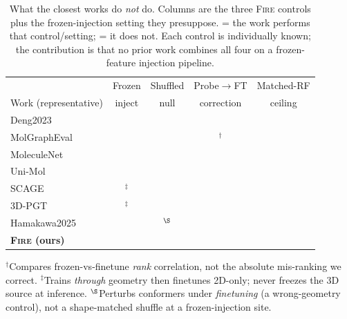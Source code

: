 \documentclass[sigconf,nonacm,anonymous,review]{acmart}
\newcommand{\cmark}{\textcolor{green!55!black}{\checkmark}}
\newcommand{\xmark}{\textcolor{red!70!black}{\ding{55}}}
\begin{document}
\begin{table}[t]
\centering
\caption{What the closest works do \emph{not} do. Columns are the three
\textsc{Fire} controls plus the frozen-injection setting they presuppose.
\cmark{} = the work performs that control/setting; \xmark{} = it does not.
Each control is individually known; the contribution is that no prior work
combines all four on a frozen-feature injection pipeline.}
\label{tab:positioning}
\small
\setlength{\tabcolsep}{4pt}
\begin{tabular}{@{}lcccc@{}}
\toprule
 & Frozen & Shuffled & Probe$\to$FT & Matched-RF \\
Work (representative) & inject & null & correction & ceiling \\
\midrule
Deng2023~\cite{deng2023systematic}        & \xmark & \xmark & \xmark & \cmark \\
MolGraphEval~\cite{wang2023molgrapheval}  & \xmark & \xmark & \xmark$^{\dagger}$ & \xmark \\
MoleculeNet~\cite{wu2018moleculenet}      & \xmark & \xmark & \xmark & \xmark \\
Uni-Mol~\cite{zhou2023unimol}             & \xmark & \xmark & \xmark & \xmark \\
SCAGE~\cite{qiao2025scage}                & \xmark$^{\ddagger}$ & \xmark & \xmark & \xmark \\
3D-PGT~\cite{wang2023threedpgt}           & \xmark$^{\ddagger}$ & \xmark & \xmark & \xmark \\
Hamakawa2025~\cite{hamakawa2025conformation} & \xmark & \cmark$^{\S}$ & \xmark & \xmark \\
\midrule
\textbf{\textsc{Fire} (ours)}             & \cmark & \cmark & \cmark & \cmark \\
\bottomrule
\end{tabular}
\par\smallskip
{\footnotesize $^{\dagger}$Compares frozen-vs-finetune \emph{rank} correlation,
not the absolute mis-ranking we correct. $^{\ddagger}$Trains \emph{through}
geometry then finetunes 2D-only; never freezes the 3D source at inference.
$^{\S}$Perturbs conformers under \emph{finetuning} (a wrong-geometry control),
not a shape-matched shuffle at a frozen-injection site.}
\end{table}
\end{document}
